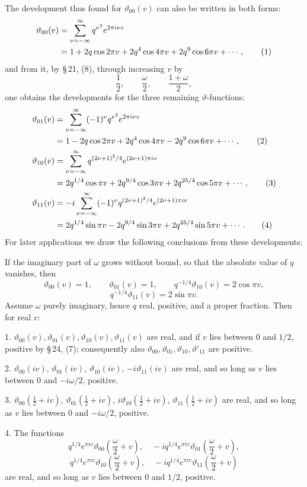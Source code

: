 \documentclass[11pt]{article}
\newcommand{\tht}{\vartheta}
\begin{document}
The development thus found for $\tht_{00}(v)$ can also be written in both forms:
\begin{align}
\tht_{00}(v)&=\sum_{\nu=-\infty}^{\infty}q^{\nu^2}e^{2\pi i\nu v} \notag\\
&=1+2q\cos2\pi v+2q^4\cos4\pi v+2q^9\cos6\pi v+\cdots, \tag{1}
\end{align}
and from it, by \S\,21, (8), through increasing $v$ by
\[
\frac12,\qquad \frac\omega2,\qquad \frac{1+\omega}{2},
\]
one obtains the developments for the three remaining $\vartheta$-functions:
\begin{align}
\tht_{01}(v)&=\sum_{\nu=-\infty}^{\infty}(-1)^\nu q^{\nu^2}e^{2\pi i\nu v} \notag\\
&=1-2q\cos2\pi v+2q^4\cos4\pi v-2q^9\cos6\pi v+\cdots, \tag{2}\\
\tht_{10}(v)&=\sum_{\nu=-\infty}^{\infty}q^{(2\nu+1)^2/4}e^{(2\nu+1)\pi iv} \notag\\
&=2q^{1/4}\cos\pi v+2q^{9/4}\cos3\pi v+2q^{25/4}\cos5\pi v+\cdots, \tag{3}\\
\tht_{11}(v)&=-i\sum_{\nu=-\infty}^{\infty}(-1)^\nu q^{(2\nu+1)^2/4}e^{(2\nu+1)\pi iv} \notag\\
&=2q^{1/4}\sin\pi v-2q^{9/4}\sin3\pi v+2q^{25/4}\sin5\pi v+\cdots. \tag{4}
\end{align}
For later applications we draw the following conclusions from these developments:

If the imaginary part of $\omega$ grows without bound, so that the absolute value of $q$ vanishes, then
\[
\tht_{00}(v)=1,\qquad \tht_{01}(v)=1,\qquad q^{-1/4}\tht_{10}(v)=2\cos\pi v,
\]
\[
q^{-1/4}\tht_{11}(v)=2\sin\pi v.
\]
Assume $\omega$ purely imaginary, hence $q$ real, positive, and a proper fraction. Then for real $v$:

1. $\tht_{00}(v),\tht_{01}(v),\tht_{10}(v),\tht_{11}(v)$ are real, and if $v$ lies between $0$ and $1/2$, positive by \S\,24, (7); consequently also $\tht_{00},\tht_{01},\tht_{10},\tht'_{11}$ are positive.

2. $\tht_{00}(iv)$, $\tht_{01}(iv)$, $\tht_{10}(iv)$, $-i\tht_{11}(iv)$ are real, and so long as $v$ lies between $0$ and $-i\omega/2$, positive.

3. $\tht_{00}(\frac12+iv)$, $\tht_{01}(\frac12+iv)$, $i\tht_{10}(\frac12+iv)$, $\tht_{11}(\frac12+iv)$ are real, and so long as $v$ lies between $0$ and $-i\omega/2$, positive.

4. The functions
\[
q^{1/4}e^{\pi iv}\tht_{00}\left(\frac\omega2+v\right),\quad
-iq^{1/4}e^{\pi iv}\tht_{01}\left(\frac\omega2+v\right),
\]
\[
q^{1/4}e^{\pi iv}\tht_{10}\left(\frac\omega2+v\right),\quad
-iq^{1/4}e^{\pi iv}\tht_{11}\left(\frac\omega2+v\right)
\]
are real, and so long as $v$ lies between $0$ and $1/2$, positive.
\end{document}
